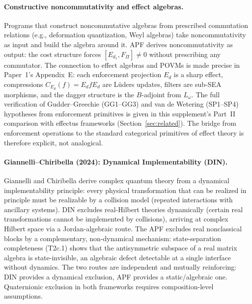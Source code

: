 \documentclass[11pt,a4paper]{article}
\theoremstyle{definition}
\begin{document}
\paragraph{Constructive noncommutativity and effect algebras.}
Programs that construct noncommutative algebras from prescribed commutation relations (e.g., deformation quantization, Weyl algebras) take noncommutativity as input and build the algebra around it.  APF derives noncommutativity as output: the cost structure forces $[E_{d_1}, F_\Pi] \ne 0$ without prescribing any commutator.  The connection to effect algebras and POVMs is made precise in Paper~1's Appendix~E: each enforcement projection $E_d$ is a sharp effect, compressions $C_{E_d}(f) = E_d f E_d$ are L\"uders updates, filters are sub-SEA morphisms, and the dagger structure is the $B$-adjoint from $L_\omega$.  The full verification of Gudder--Greechie (GG1--GG3) and van de Wetering (SP1--SP4) hypotheses from enforcement primitives is given in this supplement's Part~II comparison with effectus frameworks (Section~\ref{sec:related}).  The bridge from enforcement operations to the standard categorical primitives of effect theory is therefore explicit, not analogical.

\paragraph{Giannelli--Chiribella (2024): Dynamical Implementability (DIN).}
Giannelli and Chiribella derive complex quantum theory from a dynamical implementability principle: every physical transformation that can be realized in principle must be realizable by a collision model (repeated interactions with ancillary systems).  DIN excludes real-Hilbert theories dynamically (certain real transformations cannot be implemented by collisions), arriving at complex Hilbert space via a Jordan-algebraic route.  The APF excludes real nonclassical blocks by a complementary, non-dynamical mechanism: state-separation completeness (T2c.1) shows that the antisymmetric subspace of a real matrix algebra is state-invisible, an algebraic defect detectable at a single interface without dynamics.  The two routes are independent and mutually reinforcing: DIN provides a dynamical exclusion, APF provides a static/algebraic one.  Quaternionic exclusion in both frameworks requires composition-level assumptions.
\end{document}
